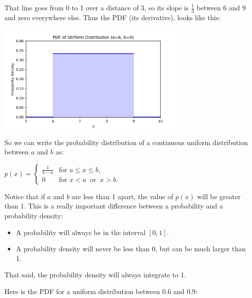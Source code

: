 That line goes from 0 to 1 over a distance of 3,   so its slope is $\frac{1}{3}$ between 6 and  9 and zero everywhere else.   Thus the PDF (its derivative),  looks like this:

\includegraphics[width=0.7\textwidth]{unif_pdf.png}

So we can write the probability distribution of a continuous uniform distribution between $a$ and $b$ as:

  $p(x) = \begin{cases}
  \frac{1}{b-a} & \text{for } a \le x \le b, \\[8pt]
  0 & \text{for } x < a \ \text{ or } \ x > b.
  \end{cases}$

Notice that if $a$ and $b$ are less than 1 apart,  the value of $p(x)$ will be greater than 1.  This is a really important difference between a probability and a probability density: 
\begin{itemize}
\item A probability will always be in  the interval $[0, 1]$.  
\item A probability density will never be less than 0,  but can be much larger than 1.
\end{itemize}

That said,  the probability density will always integrate to 1.

Here is the PDF for a uniform distribution between 0.6 and 0.9:

